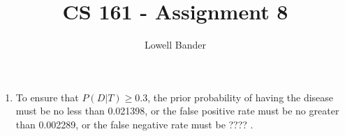 \documentclass[]{article}
\begin{document}
\title{CS 161 - Assignment 8}
\author{Lowell Bander}
\maketitle

\begin{enumerate}
\item To ensure that $P(D|T)\geq 0.3$, the prior probability of having the disease must be no less than 0.021398, or the false positive rate must be no greater than 0.002289, or the false negative rate must be ???? .
\end{enumerate}
\end{document}
